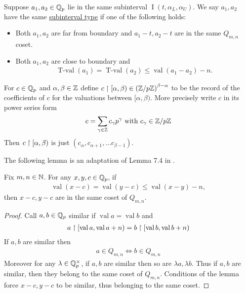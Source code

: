\documentclass{amsart}
\newcommand{\paren}[1]{\left(#1\right)}
\DeclareMathOperator{\val}{val}
\DeclareMathOperator{\vval}{val}
\DeclareMathOperator{\tval}{T-val}
\DeclareMathOperator{\inti}{I}
\newcommand{\defn}{\underline}
\newcommand{\interval}{\inti(t, \alpha_L, \alpha_U)}
\begin{document}
\begin{Definition}
  Suppose $a_1, a_2 \in \mathbb{Q}_p$ lie in the same subinterval $\interval$.
  We say $a_1, a_2$ have the same \defn{subinterval type} if one of the following holds:
  \begin{itemize}
  \item Both $a_1, a_2$ are far from boundary and $a_1 - t, a_2 - t$ are in the same $Q_{m,n}$ coset.
  \item Both $a_1, a_2$ are close to boundary and 
    \begin{align*}
	  \tval(a_1) = \tval(a_2) \leq \vval(a_1 - a_2) - n.
    \end{align*}
  \end{itemize}      
\end{Definition}


\begin{Definition}
	For $c \in \mathbb{Q}_p$ and $\alpha, \beta \in \mathbb{Z}$ define $c \midr [\alpha, \beta) \in \paren{\Z/p\Z}^{\beta - \alpha}$
  to be the record of the coefficients of $c$ for the valuations between $[\alpha, \beta)$.
  More precisely write $c$ in its power series form
  \begin{align*}
    c = \sum_{\gamma \in \mathbb{Z}} c_\gamma p^\gamma \text{ with } c_\gamma \in \mathbb{Z}/p\mathbb{Z}
  \end{align*}
  Then $c \upharpoonright [\alpha, \beta)$ is just $(c_\alpha, c_{\alpha+1}, \ldots c_{\beta - 1})$.
\end{Definition}

The following lemma is an adaptation of Lemma 7.4 in \cite{density}.
\begin{Lemma} \label{distance}
  Fix $m,n \in \mathbb{N}$.
  For any $x,y,c \in \mathbb{Q}_p$, if
  \begin{align*}
    \val (x - c) = \val (y - c) \leq \val (x - y) - n,
  \end{align*}
  then $x - c, y - c$ are in the same coset of $Q_{m,n}$.
\end{Lemma}
\begin{proof}
  Call $a,b \in \mathbb{Q}_p$ similar if $\val a = \val b$ and
  \begin{align*}
    a \midr [\val a, \val a + n) = b \midr [\val b, \val b + n)
  \end{align*}
  If $a,b$ are similar then
  \begin{align*}
    a \in Q_{m,n} \iff b \in Q_{m,n}
  \end{align*}
  Moreover for any $\lambda \in \mathbb{Q}_p^\times$, if $a,b$ are similar then so are $\lambda a, \lambda b$.
  Thus if $a,b$ are similar, then they belong to the same coset of $Q_{m,n}$.
  Conditions of the lemma force $x - c, y - c$ to be similar, thus belonging to the same coset.
\end{proof} 
\end{document}
